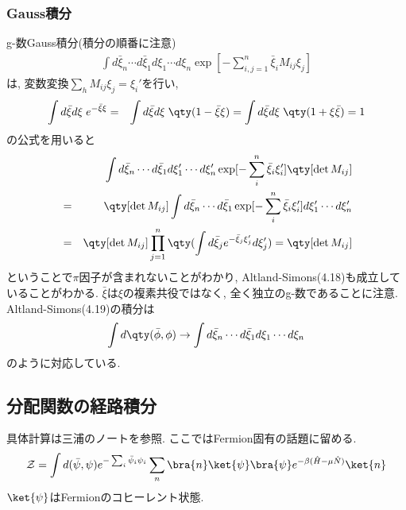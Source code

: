 \documentclass[10.5pt,a4paper]{jreport}
\begin{document}
\subsubsection{Gauss積分}
g-数Gauss積分(積分の順番に注意)
\begin{eqnarray}
  \int d\bar{\xi}_n\cdots d\bar{\xi}_1d\xi_1\cdots d\xi_n\exp[-\sum_{i, j=1}^n\bar{\xi}_iM_{ij}\xi_j]
\end{eqnarray}
は, 変数変換$\sum_h M_{ij}\xi_j = \xi_i'$を行い, 
\begin{eqnarray}
  \int d\bar{\xi} d\xi\;  e^{-\bar{\xi}\xi} &=& \int d\bar{\xi} d\xi\;  \qty(1 -\bar{\xi}\xi)= \int d\bar{\xi} d\xi\;  \qty(1 +\xi\bar{\xi}) = 1
\end{eqnarray}
の公式を用いると
\begin{eqnarray}
  &&\int d\bar{\xi}_n\cdots d\bar{\xi}_1d\xi_1'\cdots d\xi_n'\exp[-\sum_{i}^n\bar{\xi}_i\xi_i']\qty[\det M_{ij}]\\
  &=& \qty[\det M_{ij}]\int d\bar{\xi}_n\cdots d\bar{\xi}_1\exp[-\sum_{i}^n\bar{\xi}_i\xi_i']d\xi_1'\cdots d\xi_n'\\
  &=& \qty[\det M_{ij}]\prod_{j=1}^n\qty(\int d\bar{\xi}_j e^{-\bar{\xi}_j\xi_j'}d\xi_j') = \qty[\det M_{ij}]
\end{eqnarray}
ということで$\pi$因子が含まれないことがわかり, Altland-Simons(4.18)も成立していることがわかる. $\bar{\xi}$は$\xi$の複素共役ではなく, 全く独立のg-数であることに注意. Altland-Simons(4.19)の積分は
\begin{eqnarray}
  \int d\qty(\bar{\phi}, \phi) \rightarrow \int d\bar{\xi}_n\cdots d\bar{\xi}_1d\xi_1\cdots d\xi_n
\end{eqnarray}
のように対応している.
\subsection{分配関数の経路積分}
具体計算は三浦のノートを参照. ここではFermion固有の話題に留める.
\begin{eqnarray}
  {\cal Z} = \int d(\bar{\psi}, \psi)e^{-\sum_i\bar{\psi}_i\psi_i}\sum_n\bra{n}\ket{\psi}\bra{\psi}e^{-\beta(\hat{H} - \mu\hat{N})}\ket{n}
\end{eqnarray}
$\ket{\psi}$はFermionのコヒーレント状態.
\end{document}
